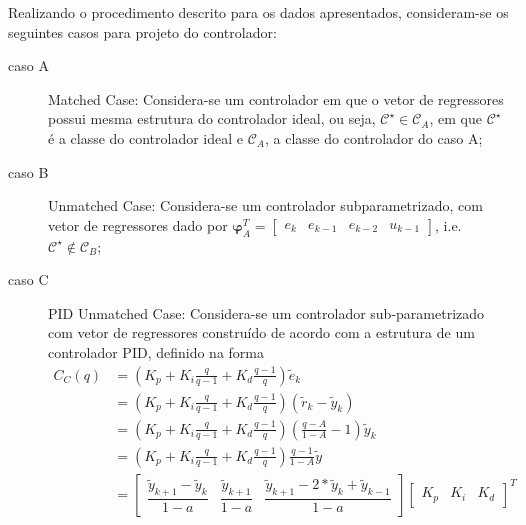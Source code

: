 \begin{exmp}
   Realizando o procedimento descrito para os dados apresentados, consideram-se os seguintes casos para projeto do controlador:
   \begin{description}
      \item[caso A] Matched Case: Considera-se um controlador em que o vetor de regressores possui mesma estrutura do controlador ideal, ou seja, $\mathscr{C}^{\star} \in \mathscr{C}_A$, em que $\mathscr{C}^{\star}$ é a classe do controlador ideal e $\mathscr{C}_{A}$, a classe do controlador do caso A;
      \item[caso B] Unmatched Case: Considera-se um controlador subparametrizado, com vetor de regressores dado por $ \bm{\varphi}^T_A =\begin{bmatrix} e_k & e_{k-1} & e_{k-2} & u_{k-1} \end{bmatrix}$, i.e. $\mathscr{C}^\star \not\in \mathscr{C}_B $;
      \item[caso C] PID Unmatched Case: Considera-se um controlador sub-parametrizado com vetor de regressores construído de acordo com a estrutura de um controlador PID, definido na forma 
         \begin{align}
            C_{C}(q) &= \left(K_p + K_i\frac{q}{q-1} + K_d\frac{q-1}{q}\right)\tilde{e}_k \nonumber \\
                     &= \left(K_p + K_i\frac{q}{q-1} + K_d\frac{q-1}{q}\right)\left(\tilde{r}_k-\tilde{y}_k\right) \nonumber \\
                     &= \left(K_p + K_i\frac{q}{q-1} + K_d\frac{q-1}{q}\right)\left(\frac{q-A}{1-A}-1\right)\tilde{y}_k \nonumber \\
                     &= \left(K_p + K_i\frac{q}{q-1} + K_d\frac{q-1}{q}\right)\frac{q-1}{1-A}\tilde{y} \nonumber \\
                     &= \begin{bmatrix} 
                        \dfrac{\tilde{y}_{k+1}-\tilde{y}_k}{1-a} & 
                        \dfrac{\tilde{y}_{k+1}}{1-a} &
                        \dfrac{\tilde{y}_{k+1}-2*\tilde{y}_k+\tilde{y}_{k-1}}{1-a} 
                     \end{bmatrix} 
            \begin{bmatrix}  K_p & K_i & K_d  \end{bmatrix}^T   

\end{align}
\end{description}
\end{exmp}
